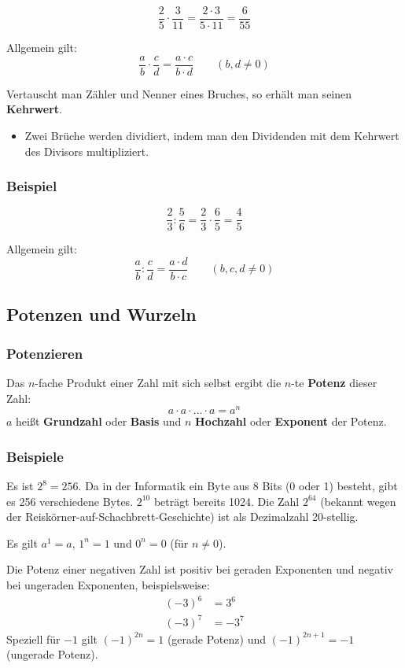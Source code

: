 \[ \frac{2}{5} \cdot \frac{3}{11} = \frac{2 \cdot 3}{5 \cdot 11} = \frac{6}{55}\]\beispielende

Allgemein gilt:
\[ \frac{a}{b} \cdot \frac{c}{d} = \frac{a \cdot c}{b \cdot d} \qquad (b, d \neq 0) \]

Vertauscht man Zähler und Nenner eines Bruches, so erhält man seinen \textbf{Kehrwert}.

\begin{itemize}
  \item Zwei Brüche werden dividiert, indem man den Dividenden mit dem Kehrwert des Divisors multipliziert.
\end{itemize}

\subsubsection{Beispiel}

\[ \frac{2}{3} : \frac{5}{6} = \frac{2}{3} \cdot \frac{6}{5} = \frac{4}{5}\]\beispielende

Allgemein gilt:
\[ \frac{a}{b} : \frac{c}{d} = \frac{a \cdot d}{b \cdot c} \qquad (b, c, d \neq 0) \]

\subsection{Potenzen und Wurzeln}

\subsubsection*{Potenzieren}

Das $n$-fache Produkt einer Zahl mit sich selbst ergibt die $n$-te \textbf{Potenz} dieser Zahl:
\[ a \cdot a \cdot \ldots \cdot a = a^n \]
$a$ heißt \textbf{Grundzahl} oder \textbf{Basis} und $n$ \textbf{Hochzahl} oder \textbf{Exponent} der Potenz.

\subsubsection{Beispiele}

Es ist $2^8 = 256$. Da in der Informatik ein Byte aus 8 Bits (0 oder 1) besteht, gibt es 256 verschiedene Bytes. $2^{10}$ beträgt bereits 1024. Die Zahl $2^{64}$ (bekannt wegen der Reiskörner-auf-Schachbrett-Geschichte) ist als Dezimalzahl 20-stellig.\beispielende

Es gilt $a^1 = a$, $1^n = 1$ und $0^n = 0$ (für $n \neq 0$).

Die Potenz einer negativen Zahl ist positiv bei geraden Exponenten und negativ bei ungeraden Exponenten, beispielsweise:
\begin{align*}
  (-3)^6 &= 3^6\\
  (-3)^7 &= -3^7
\end{align*}
Speziell für $-1$ gilt $(-1)^{2n} = 1$ (gerade Potenz) und $(-1)^{2n+1} = -1$ (ungerade Potenz).

